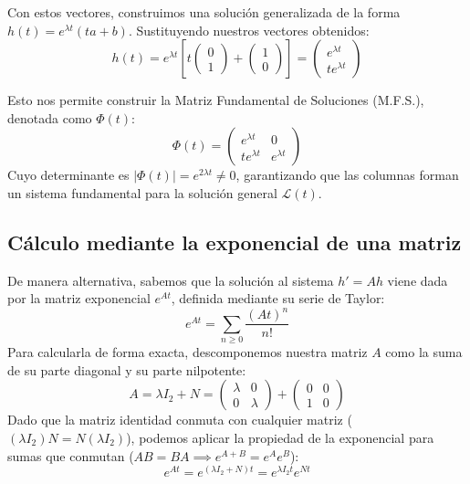 Con estos vectores, construimos una solución generalizada de la forma $h(t) = e^{\lambda t}(ta + b)$. Sustituyendo nuestros vectores obtenidos:
\[
    h(t) = e^{\lambda t} \left[ t \begin{pmatrix} 0 \\ 1 \end{pmatrix} + \begin{pmatrix} 1 \\ 0 \end{pmatrix} \right] = \begin{pmatrix} e^{\lambda t} \\ t e^{\lambda t} \end{pmatrix}
\]

Esto nos permite construir la Matriz Fundamental de Soluciones (M.F.S.), denotada como $\Phi(t)$:
\[
    \Phi(t) = \begin{pmatrix} e^{\lambda t} & 0 \\ t e^{\lambda t} & e^{\lambda t} \end{pmatrix}
\]
Cuyo determinante es $|\Phi(t)| = e^{2\lambda t} \neq 0$, garantizando que las columnas forman un sistema fundamental para la solución general $\mathcal{L}(t)$.

\subsection{Cálculo mediante la exponencial de una matriz}

De manera alternativa, sabemos que la solución al sistema $h' = Ah$ viene dada por la matriz exponencial $e^{At}$, definida mediante su serie de Taylor:
\[
    e^{At} = \sum_{n \ge 0} \frac{(At)^n}{n!}
\]
Para calcularla de forma exacta, descomponemos nuestra matriz $A$ como la suma de su parte diagonal y su parte nilpotente:
\[
    A = \lambda I_2 + N = \begin{pmatrix} \lambda & 0 \\ 0 & \lambda \end{pmatrix} + \begin{pmatrix} 0 & 0 \\ 1 & 0 \end{pmatrix}
\]
Dado que la matriz identidad conmuta con cualquier matriz ($(\lambda I_2)N = N(\lambda I_2)$), podemos aplicar la propiedad de la exponencial para sumas que conmutan ($AB=BA \implies e^{A+B} = e^A e^B$):
\[
    e^{At} = e^{(\lambda I_2 + N)t} = e^{\lambda I_2 t} e^{Nt}
\]

